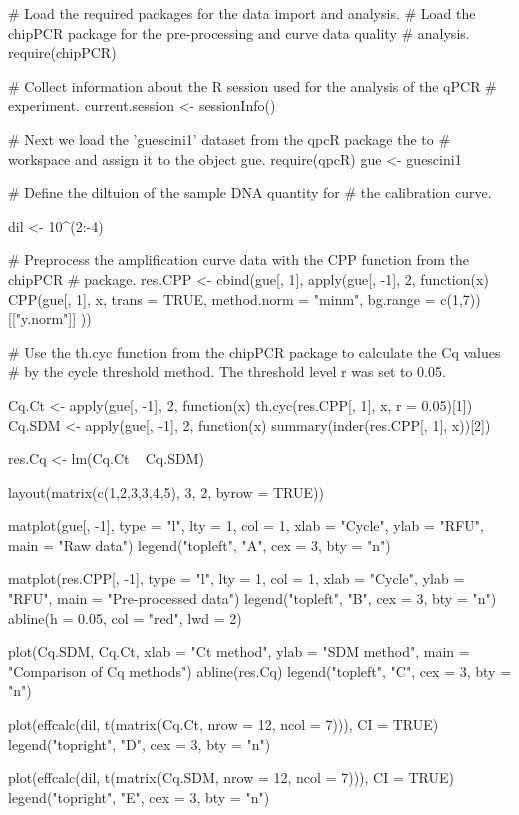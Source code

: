 \begin{example}
# Load the required packages for the data import and analysis.
# Load the chipPCR package for the pre-processing and curve data quality
# analysis.
require(chipPCR)

# Collect information about the R session used for the analysis of the qPCR
# experiment.
current.session <- sessionInfo()

# Next we load the 'guescini1' dataset from the qpcR package the to
# workspace and assign it to the object gue.
require(qpcR)
gue <- guescini1

# Define the diltuion of the sample DNA quantity for
# the calibration curve.

dil <- 10^(2:-4)

# Preprocess the amplification curve data with the CPP function from the chipPCR
# package.
res.CPP <- cbind(gue[, 1], apply(gue[, -1], 2, function(x) {
    CPP(gue[, 1], x, trans = TRUE, method.norm = "minm", bg.range = c(1,7))[["y.norm"]]
}))

# Use the th.cyc function from the chipPCR package to calculate the Cq values
# by the cycle threshold method. The threshold level r was set to 0.05.

Cq.Ct <- apply(gue[, -1], 2, function(x) 
  th.cyc(res.CPP[, 1], x, r = 0.05)[1])
Cq.SDM <- apply(gue[, -1], 2, function(x) 
  summary(inder(res.CPP[, 1], x))[2])

res.Cq <- lm(Cq.Ct ~ Cq.SDM)


layout(matrix(c(1,2,3,3,4,5), 3, 2, byrow = TRUE))

matplot(gue[, -1], type = "l", lty = 1, col = 1, xlab = "Cycle", 
	    ylab = "RFU", main = "Raw data")
legend("topleft", "A", cex = 3, bty = "n")

matplot(res.CPP[, -1], type = "l", lty = 1, col = 1, xlab = "Cycle", 
	ylab = "RFU", main = "Pre-processed data")
legend("topleft", "B", cex = 3, bty = "n")
abline(h = 0.05, col = "red", lwd = 2)

plot(Cq.SDM, Cq.Ct, xlab = "Ct method", ylab = "SDM method", 
     main = "Comparison of Cq methods")
abline(res.Cq)
legend("topleft", "C", cex = 3, bty = "n")

plot(effcalc(dil, t(matrix(Cq.Ct, nrow = 12, ncol = 7))), CI = TRUE)
legend("topright", "D", cex = 3, bty = "n")

plot(effcalc(dil, t(matrix(Cq.SDM, nrow = 12, ncol = 7))), CI = TRUE)
legend("topright", "E", cex = 3, bty = "n")
\end{example}

